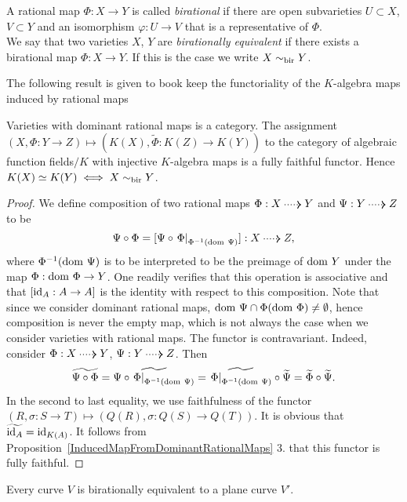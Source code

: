     \begin{definition}
        A rational map $\Phi: X\rightarrow Y$ is called \textit{birational} if there are open subvarieties $U\subset X$, $V\subset Y$ and an isomorphism $\varphi: U\rightarrow V$ that is a representative of $\Phi$. \\
        We say that two varieties $X$, $Y$ are \textit{birationally equivalent} if there exists a birational map $\Phi : X\rightarrow Y$. If this is the case we write $X \sim_{\mathrm{bir}} Y$.
    \end{definition}
    The following result is given to book keep the functoriality of the $K$-algebra maps induced by rational maps 
    \begin{theorem}
        Varieties with dominant rational maps is a category. The assignment $(X,\Phi: Y\rightarrow Z)\mapsto (K(X), \widetilde{\Phi}: K(Z)\rightarrow K(Y))$ to the category of algebraic function fields$/K$ with injective $K$-algebra maps is a fully faithful functor. Hence $K(X)\simeq K(Y)\iff X \sim_{\mathrm{bir}} Y$.
    \end{theorem}
    \begin{proof}
        We define composition of two rational maps $\Phi: X\dottedarrow Y$ and $\Psi: Y\dottedarrow Z$ to be 
        $$\Psi\circ \Phi = [\Psi \circ \left.\Phi\right|_{\Phi^{-1}(\dom\ \Psi)}] : X\dottedarrow Z,$$
        where $\Phi^{-1}(\mathrm{dom} \ \Psi)$ is to be interpreted to be the preimage of $\dom\ Y$ under the map $\Phi: \mathrm{dom} \ \Phi \rightarrow Y$. One readily verifies that this operation is associative and that $[\mathrm{id}_A : A \rightarrow A]$ is the identity with respect to this composition. Note that since we consider dominant rational maps, $\mathrm{dom} \ \Psi \cap \Phi(\mathrm{dom} \ \Phi)\neq \emptyset$, hence composition is never the empty map, which is not always the case when we consider varieties with  rational maps. The functor is contravariant. Indeed, consider $\Phi: X\dottedarrow Y$, $\Psi: Y\dottedarrow Z$. Then
        $$\widetilde{\Psi\circ \Phi}= \widetilde{ \Psi \circ \left.\Phi\right|_{\Phi^{-1}(\mathrm{dom}\ \Psi)}} = \widetilde{\left.\Phi\right|_{\Phi^{-1}(\mathrm{dom}\ \Psi)}}\circ \widetilde{\Psi} = \widetilde{\Phi}\circ \widetilde{\Psi}.$$
        In the second to last equality, we use faithfulness of the functor $(R, \sigma : S\rightarrow T) \mapsto (Q(R),\sigma : Q(S)\rightarrow Q(T))$. It is obvious that $\widetilde{\mathrm{id}_A} = \mathrm{id}_{K(A)}$. It follows from Proposition~\ref{InducedMapFromDominantRationalMaps} 3. that this functor is fully faithful.
    \end{proof}
    \begin{corollary}
        Every curve $V$ is birationally equivalent to a plane curve $V'$.
    \end{corollary}
